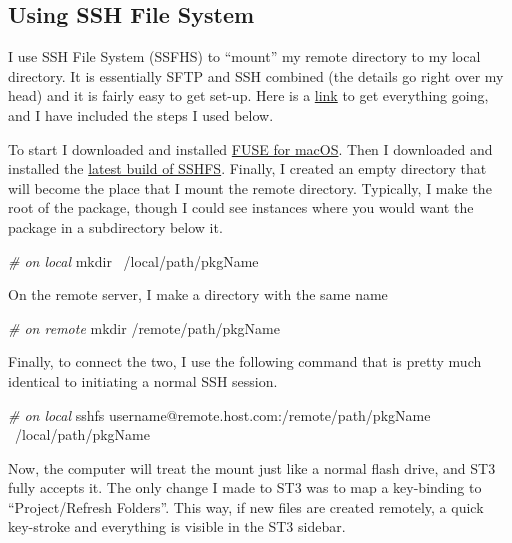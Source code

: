 \documentclass[]{book}
\newenvironment{Shaded}{\begin{snugshade}}{\end{snugshade}}
\newcommand{\CommentTok}[1]{\textcolor[rgb]{0.56,0.35,0.01}{\textit{#1}}}
\newcommand{\ExtensionTok}[1]{#1}
\newcommand{\FunctionTok}[1]{\textcolor[rgb]{0.00,0.00,0.00}{#1}}
\newcommand{\NormalTok}[1]{#1}
\begin{document}
\hypertarget{using-ssh-file-system}{%
\subsection{Using SSH File System}\label{using-ssh-file-system}}

I use SSH File System (SSFHS) to ``mount'' my remote directory to my local directory. It is essentially SFTP and SSH combined (the details go right over my head) and it is fairly easy to get set-up. Here is a \href{https://github.com/osxfuse/osxfuse/wiki/SSHFS}{link} to get everything going, and I have included the steps I used below.

To start I downloaded and installed \href{https://osxfuse.github.io}{FUSE for macOS}. Then I downloaded and installed the \href{https://github.com/osxfuse/sshfs/releases}{latest build of SSHFS}. Finally, I created an empty directory that will become the place that I mount the remote directory. Typically, I make the root of the package, though I could see instances where you would want the package in a subdirectory below it.

\begin{Shaded}
\begin{Highlighting}[]
\CommentTok{# on local}
\FunctionTok{mkdir}\NormalTok{ ~/local/path/pkgName}
\end{Highlighting}
\end{Shaded}

On the remote server, I make a directory with the same name

\begin{Shaded}
\begin{Highlighting}[]
\CommentTok{# on remote}
\FunctionTok{mkdir}\NormalTok{ /remote/path/pkgName}
\end{Highlighting}
\end{Shaded}

Finally, to connect the two, I use the following command that is pretty much identical to initiating a normal SSH session.

\begin{Shaded}
\begin{Highlighting}[]
\CommentTok{# on local}
\ExtensionTok{sshfs}\NormalTok{ username@remote.host.com:/remote/path/pkgName ~/local/path/pkgName}
\end{Highlighting}
\end{Shaded}

Now, the computer will treat the mount just like a normal flash drive, and ST3 fully accepts it. The only change I made to ST3 was to map a key-binding to ``Project/Refresh Folders''. This way, if new files are created remotely, a quick key-stroke and everything is visible in the ST3 sidebar.
\end{document}
